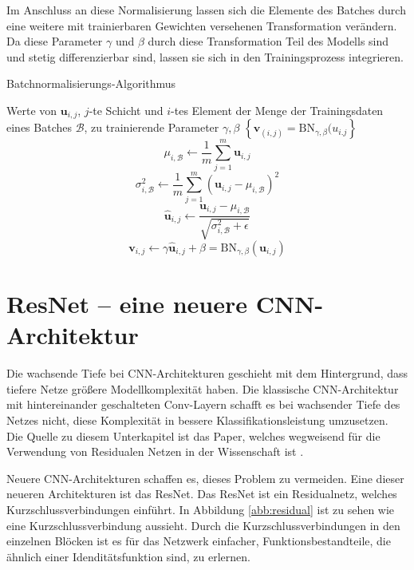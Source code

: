 Im Anschluss an diese Normalisierung lassen sich die Elemente des Batches durch eine weitere mit trainierbaren Gewichten versehenen Transformation verändern. Da diese Parameter $\gamma$ und $\beta$ durch diese Transformation Teil des Modells sind und stetig differenzierbar sind, lassen sie sich in den Trainingsprozess integrieren.

\renewcommand{\algorithmicrequire}{\textbf{Eingabe:}}
\renewcommand{\algorithmicensure}{\textbf{Ausgabe:}}


\begin{algorithm}[H]
\caption{Batchnormalisierungs-Algorithmus}
\begin{algorithmic}
\REQUIRE Werte von $\mathbf{u}_{i,j}$, $j$-te  Schicht und $i$-tes Element der Menge der Trainingsdaten  eines Batches $\mathcal{B}$, zu trainierende Parameter $\gamma, \beta$
\ENSURE $\left\{ \mathbf{v}_{(i,j)} =\text{BN}_{\gamma, \beta}(u_{i.j} \right\} $
\STATE $$\mu_{i,\mathcal{B}} \leftarrow \frac{1}{m}\sum_{j=1}^{m} \mathbf{u}_{i,j}$$
\STATE $$\sigma^2_{i,\mathcal{B}} \leftarrow \frac{1}{m} \sum_{j=1}^m \left( \mathbf{u}_{i,j} -\mu_{i,\mathcal{B}}\right)^2$$
\STATE $$ \hat{\mathbf{u}}_{i,j} \leftarrow \frac{\mathbf{u}_{i,j}-\mu_{i,\mathcal{B}}}{\sqrt{\sigma_{i,\mathcal{B}}^2+\epsilon}}$$
\STATE $$\mathbf{v}_{i,j} \leftarrow \gamma \hat{\mathbf{u}}_{i,j} + \beta  = \text{BN}_{\gamma,\beta}(\mathbf{u}_{i,j})$$
\end{algorithmic}
\label{alg:bn}
\end{algorithm}


\color{black}


\section{ResNet -- eine neuere CNN-Architektur}\label{sec:res}
Die wachsende Tiefe bei CNN-Architekturen geschieht mit dem Hintergrund, dass tiefere Netze größere Modellkomplexität haben. Die klassische CNN-Architektur mit hintereinander geschalteten Conv-Layern schafft es bei wachsender Tiefe des Netzes nicht, diese Komplexität in bessere Klassifikationsleistung umzusetzen. Die Quelle zu diesem Unterkapitel ist das Paper, welches wegweisend für die Verwendung von Residualen Netzen in der Wissenschaft ist \cite{resnet}.


Neuere CNN-Architekturen schaffen es, dieses Problem zu vermeiden. Eine dieser neueren Architekturen ist das ResNet. Das ResNet ist ein Residualnetz, welches Kurzschlussverbindungen einführt. In Abbildung \ref{abb:residual} ist zu sehen wie eine Kurzschlussverbindung aussieht. Durch die Kurzschlussverbindungen in den einzelnen Blöcken ist es für das Netzwerk einfacher, Funktionsbestandteile, die ähnlich einer Idenditätsfunktion sind, zu erlernen.   


